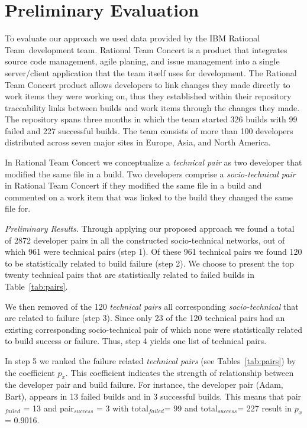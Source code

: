 \documentclass[conference]{IEEEtran}
\begin{document}
\section{Preliminary Evaluation}
To evaluate our approach we used data provided by the IBM Rational Team\texttrademark\ development team.
Rational Team Concert is a product that integrates source code management, agile planing, and issue management into a single server/client application that the team itself uses for development.
The Rational Team Concert product allows developers to link changes they made directly to work items they were working on, thus they established within their repository traceability links between builds and work items through the changes they made.
The repository spans three months in which the team started 326 builds with 99 failed and 227 successful builds.
The team consists of more than 100 developers distributed across seven major sites in Europe, Asia, and North America.


In Rational Team Concert we conceptualize a \emph{technical pair} as two developer that modified the same file in a build.
Two developers comprise a \emph{socio-technical pair} in Rational Team Concert if they modified the same file in a build and commented on a work item that was linked to the build they changed the same file for.



\emph{Preliminary Results.}
Through applying our proposed approach we found a total of 2872 developer pairs in all the constructed socio-technical networks, out of which 961 were technical pairs (step 1).
Of these 961 technical pairs we found 120 to be statistically related to build failure (step 2). 
We choose to present the top twenty technical pairs that are statistically related to failed builds in Table~\ref{tab:pairs}.

We then removed of the 120 \emph{technical pairs} all corresponding \emph{socio-technical} that are related to failure (step 3).
Since only 23 of the 120 technical pairs had an existing corresponding socio-technical pair of which none were statistically related to build success or failure.
Thus, step 4 yields one list of technical pairs.

In step 5 we ranked the failure related \emph{technical pairs} (see Tables~\ref{tab:pairs})
by the coefficient $p_{x}$. This coefficient indicates the strength of
relationship between the developer pair and build failure. For instance, the
developer pair (Adam, Bart), appears in 13 failed builds and in 3
successful builds. This means that pair$_{failed}$ = 13 and pair$_{success}$ = 3
with total$_{failed}$= 99 and total$_{success}$= 227 result in $p_x$= 0.9016.
\end{document}

